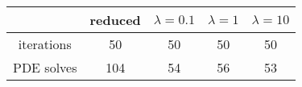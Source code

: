 \begin{tabular}{ccccc}
& reduced & $\lambda = 0.1$ & $\lambda = 1$ & $\lambda = 10$ \\
\hline
iterations & 50 & 50 & 50 & 50 \\
PDE solves & 104 & 54 & 56 & 53 \\
\hline
\end{tabular}
